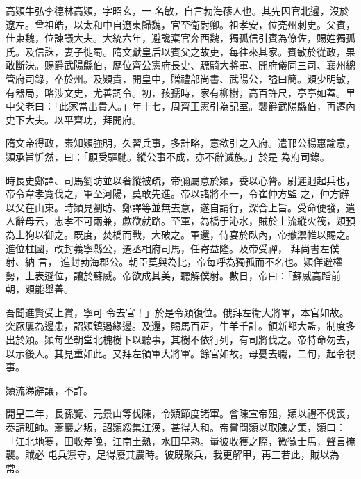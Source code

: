 
\begin{pinyinscope}

 高熲牛弘李德林高熲，字昭玄，一
 名敏，自言勃海蓚人也。其先因官北邊，沒於遼左。曾祖皓，以太和中自遼東歸魏，官至衛尉卿。祖孝安，位兗州刺史。父賓，仕東魏，位諫議大夫。大統六年，避讒棄官奔西魏，獨孤信引賓為僚佐，賜姓獨孤氏。及信誅，妻子徙蜀。隋文獻皇后以賓父之故吏，每往來其家。賓敏於從政，果敢斷決。賜爵武陽縣伯，歷位齊公憲府長史、驃騎大將軍、開府儀同三司、襄州總管府司錄，卒於州。及熲貴，開皇中，贈禮部尚書、武陽公，謚曰簡。熲少明敏，有器局，略涉文史，尤善詞令。初，孩孺時，家有柳樹，高百許尺，亭亭如蓋。里中父老曰：「此家當出貴人。」年十七，周齊王憲引為記室。襲爵武陽縣伯，再遷內史下大夫。以平齊功，拜開府。



 隋文帝得政，素知熲強明，久習兵事，多計略，意欲引之入府。遣邗公楊惠諭意，熲承旨忻然，曰：「願受驅馳。縱公事不成，亦不辭滅族。」於是
 為府司錄。



 時長史鄭譯、司馬劉昉並以奢縱被疏，帝彌屬意於熲，委以心膂。尉遲迥起兵也，帝令韋孝寬伐之，軍至河陽，莫敢先進。帝以諸將不一，令崔仲方監
 之，仲方辭以父在山東。時熲見劉昉、鄭譯等並無去意，遂自請行，深合上旨。受命便發，遣人辭母云，忠孝不可兩兼，歔欷就路。至軍，為橋于沁水，賊於上流縱火筏，熲預為土狗以御之。既度，焚橋而戰，大破之。軍還，侍宴於臥內，帝撤禦帷以賜之。進位柱國，改封義寧縣公，遷丞相府司馬，任寄益隆。及帝受禪，
 拜尚書左僕射、納
 言，
 進封勃海郡公。朝臣莫與為比，帝每呼為獨孤而不名也。熲佯避權勢，上表遜位，讓於蘇威。帝欲成其美，聽解僕射。數日，帝曰：「蘇威高蹈前朝，熲能舉善。



 吾聞進賢受上賞，寧可
 令去官！」於是令熲復位。俄拜左衛大將軍，本官如故。突厥屢為邊患，詔熲鎮遏緣邊。及還，賜馬百疋，牛羊千計。領新都大監，制度多出於熲。熲每坐朝堂北槐樹下以聽事，其樹不依行列，有司將伐之。帝特命勿去，以示後人。其見重如此。又拜左領軍大將軍。餘官如故。母憂去職，二旬，起令視事。



 熲流涕辭讓，不許。



 開皇二年，長孫覽、元景山等伐陳，令熲節度諸軍。會陳宣帝殂，熲以禮不伐喪，奏請班師。蕭巖之叛，詔熲綏集江漢，甚得人和。帝嘗問熲以取陳之策，熲曰：「江北地寒，田收差晚，江南土熱，水田早熟。量彼收獲之際，微徵士馬，聲言掩襲。賊必
 屯兵禦守，足得廢其農時。彼既聚兵，我更解甲，再三若此，賊以為常。




\end{pinyinscope}
